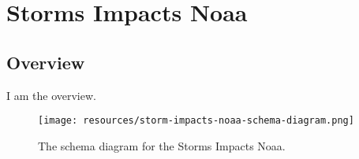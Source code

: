 
\section{Storms Impacts Noaa}
\label{sec:storms-impacts-noaa}
\subsection{Overview}
\label{ssec:overview}

I am the overview.

\begin{figure}[h!]
  \begin{center}
    \texttt{[image: resources/storm-impacts-noaa-schema-diagram.png]}
  \end{center}
  \caption{The schema diagram for the Storms Impacts Noaa.}
  \label{fig:ov-diagram}
\end{figure}


